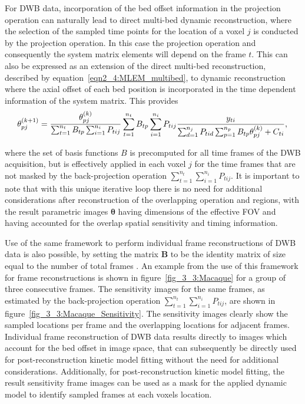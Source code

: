 For DWB data, incorporation of the bed offset information in the projection operation can naturally lead to direct multi-bed dynamic reconstruction, where the selection of the sampled time points for the location of a voxel $j$ is conducted by the projection operation. In this case the projection operation and consequently the system matrix elements will depend on the frame $t$. 
This can also be expressed as an extension of the direct multi-bed reconstruction, described by equation~\ref{eqn2_4:MLEM_multibed}, to dynamic reconstruction where the axial offset of each bed position is incorporated in the time dependent information of the system matrix.
This provides
%
\begin{equation}
\theta_{pj}^{(k+1)} = \frac{\theta_{pj}^{(k)}}
{\sum_{t=1}^{n_t} B_{tp} \sum_{i=1}^{n_i} P_{tij}} 
\sum_{t=1}^{n_t} B_{tp}  \sum_{i=1}^{n_i} P_{tij} 
\frac{y_{ti}}
{\sum_{d=1}^{n_j} P_{tid} \sum_{p=1}^{n_p} B_{tp}\theta_{pj}^{(k)} + C_{ti} } \\, \\
\label{eqn:4DMLEM_Multibed}
\end{equation} 

where the set of basis functions $B$ is precomputed for all time frames of the DWB acquisition, but is effectively applied in each voxel $j$ for the time frames that are not masked by the back-projection operation $\sum_{t=1}^{n_t} \sum_{i=1}^{n_i} P_{tij}$.
It is important to note that with this unique iterative loop there is no need for additional considerations after reconstruction of the overlapping operation and regions, with the result parametric images $\boldsymbol\theta$ having dimensions of the effective FOV and having accounted for the overlap spatial sensitivity and timing information.

Use of the same framework to perform individual frame reconstructions of DWB data is also possible, by setting the matrix $\boldsymbol{B}$ to be the identity matrix of size equal to the number of total frames . 
An example from the use of this framework for frame reconstructions is shown in figure~\ref{fig_3_3:Macaque} for a group of three consecutive frames. The sensitivity images for the same frames, as estimated by the back-projection operation $\sum_{t=1}^{n_t} \sum_{i=1}^{n_i} P_{tij}$, are shown in figure~\ref{fig_3_3:Macaque_Sensitivity}.
The sensitivity images clearly show the sampled locations per frame and the overlapping locations for adjacent frames. 
Individual frame reconstruction of DWB data results directly to images which account for the bed offset in image space, that can subsequently be directly used for post-reconstruction kinetic model fitting without the need for additional considerations. Additionally, for post-reconstruction kinetic model fitting, the result sensitivity frame images can be used as a mask for the applied dynamic model to identify sampled frames at each voxels location.

